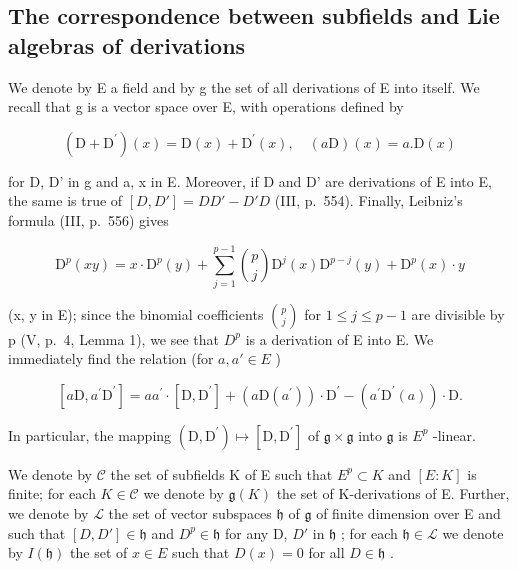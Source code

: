 \subsection{The correspondence between subfields and Lie algebras of derivations}

We denote by E a field and by g the set of all derivations of E into itself. We recall that g is a vector space over E, with operations defined by

\[
\left(\mathrm{D} + \mathrm{D} ^ {\prime}\right) (x) = \mathrm{D} (x) + \mathrm{D} ^ {\prime} (x), \quad (a \mathrm{D}) (x) = a. \mathrm{D} (x)\tag{6}
\]

for D, D' in g and a, x in E. Moreover, if D and D' are derivations of E into E, the same is true of \([D, D'] = DD' - D'D\) (III, p.~554). Finally, Leibniz's formula (III, p.~556) gives

\[
\mathrm{D} ^ {p} (x y) = x \cdot \mathrm{D} ^ {p} (y) + \sum_ {j = 1} ^ {p - 1} \binom {p} {j} \mathrm{D} ^ {j} (x) \mathrm{D} ^ {p - j} (y) + \mathrm{D} ^ {p} (x) \cdot y
\]

(x, y in E); since the binomial coefficients \(\binom{p}{j}\) for \(1 \leqslant j \leqslant p - 1\) are divisible by p (V, p.~4, Lemma 1), we see that \(D^{p}\) is a derivation of E into E. We immediately find the relation (for \(a, a' \in E\) )

\[
\left[ a \mathrm{D}, a ^ {\prime} \mathrm{D} ^ {\prime} \right] = a a ^ {\prime} \cdot \left[ \mathrm{D}, \mathrm{D} ^ {\prime} \right] + \left(a \mathrm{D} \left(a ^ {\prime}\right)\right) \cdot \mathrm{D} ^ {\prime} - \left(a ^ {\prime} \mathrm{D} ^ {\prime} (a)\right) \cdot \mathrm{D}.\tag{7}
\]

In particular, the mapping \((\mathrm{D},\mathrm{D}^{\prime})\mapsto [\mathrm{D},\mathrm{D}^{\prime}]\) of \(\mathfrak{g}\times \mathfrak{g}\) into \(\mathfrak{g}\) is \(E^p\) -linear.

We denote by \(\mathcal{C}\) the set of subfields K of E such that \(E^p \subset K\) and \([E:K]\) is finite; for each \(K \in \mathcal{C}\) we denote by \(\mathfrak{g}(K)\) the set of K-derivations of E. Further, we denote by \(\mathcal{L}\) the set of vector subspaces \(\mathfrak{h}\) of \(\mathfrak{g}\) of finite dimension over E and such that \([D,D'] \in \mathfrak{h}\) and \(D^p \in \mathfrak{h}\) for any D, \(D'\) in \(\mathfrak{h}\) ; for each \(\mathfrak{h} \in \mathcal{L}\) we denote by \(I(\mathfrak{h})\) the set of \(x \in E\) such that \(D(x) = 0\) for all \(D \in \mathfrak{h}\) .

